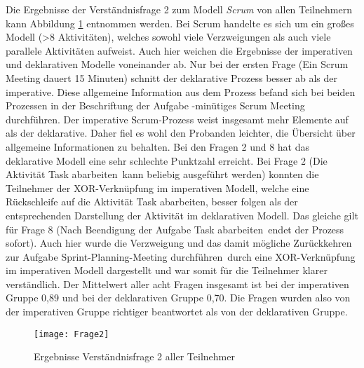 Die Ergebnisse der Verständnisfrage 2 zum Modell \textit{Scrum} von allen Teilnehmern kann Abbildung \ref{fig:Frage2} entnommen werden.  Bei Scrum handelte es sich um ein großes Modell (>8 Aktivitäten), welches sowohl viele Verzweigungen als auch viele parallele Aktivitäten aufweist. Auch hier weichen die Ergebnisse der imperativen und deklarativen Modelle voneinander ab.\newline
Nur bei der ersten Frage (\grqq Ein Scrum Meeting dauert 15 Minuten\grqq) schnitt der deklarative Prozess besser ab als der imperative. Diese allgemeine Information aus dem Prozess befand sich bei beiden Prozessen in der Beschriftung der Aufgabe -minütiges Scrum Meeting durchführen\grqq. Der imperative Scrum-Prozess weist insgesamt mehr Elemente auf als der deklarative. Daher fiel es wohl den Probanden leichter, die Übersicht über allgemeine Informationen zu behalten.\newline
Bei den Fragen 2 und 8 hat das deklarative Modell eine sehr schlechte Punktzahl erreicht. Bei Frage 2 (\grqq Die Aktivität \grqq Task abarbeiten\grqq \ kann beliebig ausgeführt werden\grqq) konnten die Teilnehmer der XOR-Verknüpfung im imperativen Modell, welche eine Rückschleife auf die Aktivität \grqq Task abarbeiten\grqq, besser folgen als der entsprechenden Darstellung der Aktivität im deklarativen Modell. \newline
Das gleiche gilt für Frage 8 (\grqq Nach Beendigung der Aufgabe \grqq Task abarbeiten\grqq \ endet der Prozess sofort\grqq). Auch hier wurde die Verzweigung und das damit mögliche Zurückkehren zur Aufgabe \grqq Sprint-Planning-Meeting durchführen\grqq \ durch eine XOR-Verknüpfung im imperativen Modell dargestellt und war somit für die Teilnehmer klarer verständlich.\newline
Der Mittelwert aller acht Fragen insgesamt ist bei der imperativen Gruppe 0,89 und bei der deklarativen Gruppe 0,70. Die Fragen wurden also von der imperativen Gruppe richtiger beantwortet als von der deklarativen Gruppe.\newline


\begin{figure}[htp]
\begin{center}
  \texttt{[image: Frage2]} %
  \caption{Ergebnisse Verständnisfrage 2 aller Teilnehmer}
  \label{fig:Frage2}
\end{center}
\end{figure}

